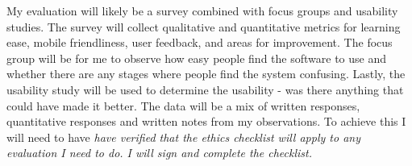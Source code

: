 \documentclass[11pt]{article}
\begin{document}
My evaluation will likely be a survey combined with focus groups and usability studies. The survey will collect qualitative and quantitative metrics for learning ease, mobile friendliness, user feedback, and areas for improvement. The focus group will be for me to observe how easy people find the software to use and whether there are any stages where people find the system confusing. Lastly, the usability study will be used to determine the usability - was there anything that could have made it better.  The data will be a mix of written responses, quantitative responses and written notes from my observations. To achieve this I will need to have \emph{have verified that the ethics checklist will apply to any evaluation I need to do. I will sign and complete the checklist.}
\end{document}

